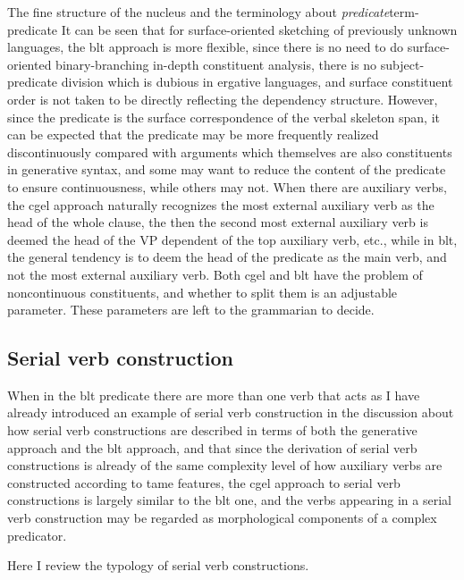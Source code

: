 \documentclass{article}
\newcommand*{\term}[1]{\emph{#1}}
\begin{document}
\begin{infobox}{The fine structure of the nucleus and the terminology about \term{predicate}}{term-predicate}
    It can be seen that for surface-oriented sketching of previously unknown languages,
    the \ac{blt} approach is more flexible,
    since there is no need to do surface-oriented binary-branching in-depth constituent analysis,
    there is no subject-predicate division which is dubious in ergative languages, %
    and surface constituent order is not taken to be directly reflecting the dependency structure.
    However, since the predicate is the surface correspondence of the verbal skeleton span,
    it can be expected that the predicate may be more frequently realized discontinuously
    compared with arguments which themselves are also constituents in generative syntax,
    and some may want to reduce the content of the predicate to ensure continuousness,
    while others may not.
    When there are auxiliary verbs,
    the \ac{cgel} approach naturally recognizes 
    the most external auxiliary verb as the head of the whole clause,
    the then the second most external auxiliary verb is deemed
    the head of the VP dependent of the top auxiliary verb, etc., 
    while in \ac{blt}, the general tendency is to deem 
    the head of the predicate as the main verb, and not the most external auxiliary verb.
    Both \ac{cgel} and \ac{blt} have the problem of noncontinuous constituents,
    and whether to split them is an adjustable parameter.
    These parameters are left to the grammarian to decide.
\end{infobox}


\subsection{Serial verb construction}\label{sec:serial-verb-construction}

When in the \ac{blt} predicate there are more than one verb that acts as 
I have already introduced an example of serial verb construction 
in the discussion about 
how serial verb constructions are described in terms of 
both the generative approach and the \ac{blt} approach,
and that since the derivation of serial verb constructions 
is already of the same complexity level of how auxiliary verbs are constructed according to \ac{tame} features,
the \ac{cgel} approach to serial verb constructions is largely similar to the \ac{blt} one,
and the verbs appearing in a serial verb construction 
may be regarded as morphological components of a complex predicator.

Here I review the typology of serial verb constructions. %
\end{document}
